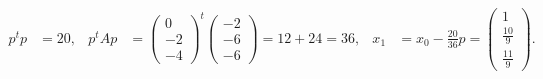 \begin{loesung}
\begin{teilaufgaben}
\begin{align*}
p^tp&=20,
&
p^tAp&=\begin{pmatrix}0\\-2\\-4\end{pmatrix}^t
\begin{pmatrix} -2\\-6\\-6 \end{pmatrix}
=12+24=36,
&
x_1&=x_0-\frac{20}{36}p
=\begin{pmatrix}
1\\
\frac{10}{9}\\
\frac{11}{9}
\end{pmatrix}.
\end{align*}
\end{teilaufgaben}
\end{loesung}


